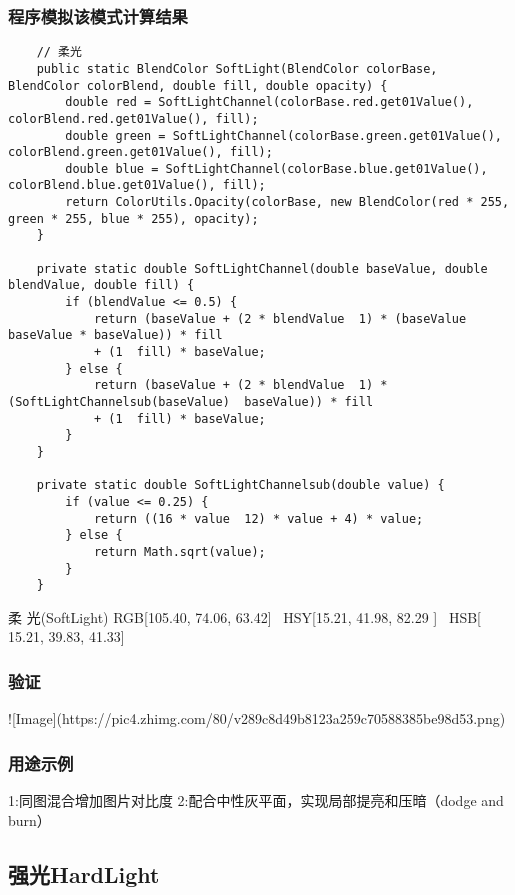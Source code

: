 \subsubsection{ 程序模拟该模式计算结果}

\begin{lstlisting}
	// 柔光
	public static BlendColor SoftLight(BlendColor colorBase, BlendColor colorBlend, double fill, double opacity) {
		double red = SoftLightChannel(colorBase.red.get01Value(), colorBlend.red.get01Value(), fill);
		double green = SoftLightChannel(colorBase.green.get01Value(), colorBlend.green.get01Value(), fill);
		double blue = SoftLightChannel(colorBase.blue.get01Value(), colorBlend.blue.get01Value(), fill);
		return ColorUtils.Opacity(colorBase, new BlendColor(red * 255, green * 255, blue * 255), opacity);
	}
	
	private static double SoftLightChannel(double baseValue, double blendValue, double fill) {
		if (blendValue <= 0.5) {
			return (baseValue + (2 * blendValue  1) * (baseValue  baseValue * baseValue)) * fill
			+ (1  fill) * baseValue;
		} else {
			return (baseValue + (2 * blendValue  1) * (SoftLightChannelsub(baseValue)  baseValue)) * fill
			+ (1  fill) * baseValue;
		}
	}
	
	private static double SoftLightChannelsub(double value) {
		if (value <= 0.25) {
			return ((16 * value  12) * value + 4) * value;
		} else {
			return Math.sqrt(value);
		}
	}
\end{lstlisting}



柔    光(SoftLight)     RGB[105.40,  74.06,  63.42]~ HSY[15.21,  41.98,  82.29 ]~ HSB[ 15.21,  39.83,  41.33]


\subsubsection{ 验证}

![Image](https://pic4.zhimg.com/80/v289c8d49b8123a259c70588385be98d53.png)

\subsubsection{ 用途示例}

1:同图混合增加图片对比度
2:配合中性灰平面，实现局部提亮和压暗（dodge and burn）

\subsection{ 强光HardLight}

